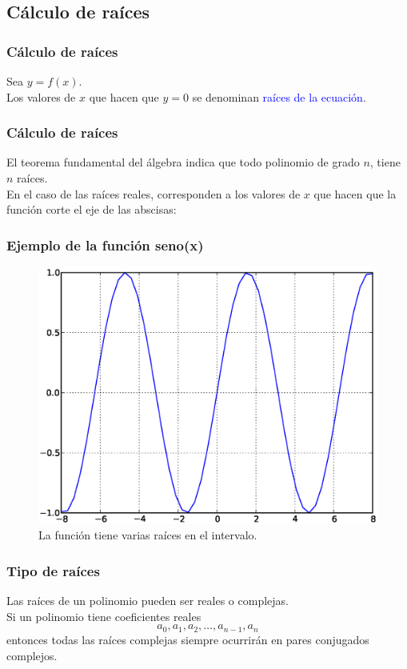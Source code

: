 \subsection{Cálculo de raíces}
\begin{frame}
\frametitle{Cálculo de raíces}
Sea $y= f(x)$.  
\\
\bigskip
Los valores de $x$ que hacen que $y=0$ se denominan \textcolor{blue}{raíces de la ecuación}.
\end{frame}
\begin{frame}
\frametitle{Cálculo de raíces}
El teorema fundamental del álgebra indica que todo polinomio de grado $n$, tiene $n$ raíces.
\\
\bigskip
En el caso de las raíces reales, corresponden a los valores de $x$ que hacen que la función corte el eje de las abscisas:
\end{frame}
\begin{frame}
\frametitle{Ejemplo de la función seno(x)}
\begin{figure}
	\centering
	\includegraphics[scale=0.4]{Imagenes/raices00.eps}
	\caption{La función tiene varias raíces en el intervalo.} 
\end{figure}
\end{frame}
\begin{frame}
\frametitle{Tipo de raíces}
Las raíces de un polinomio pueden ser reales o complejas.
\\
\bigskip
Si un polinomio tiene coeficientes reales
\[ a_{0},a_{1},a_{2},\ldots,a_{n-1},a_{n} \]
entonces todas las raíces complejas siempre ocurrirán en pares conjugados complejos.
\end{frame}
